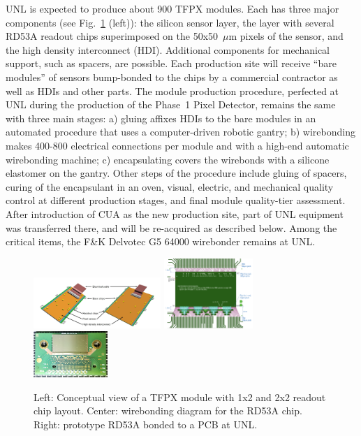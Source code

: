 UNL is expected to produce about 900 TFPX modules. Each  has three major components (see Fig.~\ref{fig:TFPXmodule} (left)): the silicon sensor layer, the layer with several RD53A readout chips superimposed on the 50x50~$\mu$m pixels of the sensor, and the high density interconnect (HDI). Additional components for mechanical support, such as spacers, are possible. Each production site will receive ``bare modules'' of sensors bump-bonded to the chips by a commercial contractor as well as HDIs and other parts. The module production procedure, perfected at UNL during the production of the Phase~1 Pixel Detector, remains the same with three main stages: a) gluing affixes HDIs to the bare modules in an automated procedure that uses a computer-driven robotic gantry; b) wirebonding makes 400-800 electrical connections per module and with a high-end automatic wirebonding machine; c) encapsulating covers the wirebonds with a silicone elastomer on the gantry. Other steps of the  procedure include gluing of spacers, curing of the encapsulant in an oven, visual, electric, and mechanical quality control at different production stages, and final module quality-tier assessment. After introduction of CUA as the new production site, part of UNL equipment was transferred there, and will be re-acquired as described below. Among the critical items, the F\&K Delvotec G5 64000 wirebonder remains at UNL.

\begin{figure}
\centering\includegraphics[width=0.43\textwidth]{figs/phase2_pixel_module_lowres.png}
\centering\includegraphics[width=0.30\textwidth]{figs/RD53A_wirebonding_diagram.png}
\centering\includegraphics[width=0.25\textwidth]{figs/RD53A_bonded_chip.png}
\caption{\label{fig:TFPXmodule} Left: Conceptual view of a TFPX module with 1x2 and 2x2 readout chip layout. Center: wirebonding diagram for the RD53A chip. Right: prototype RD53A bonded to a PCB at UNL.}
\end{figure}

